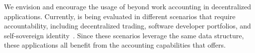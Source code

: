 We envision and encourage the usage of \TrustChain{} beyond work accounting in decentralized applications.
Currently, \TrustChain{} is being evaluated in different scenarios that require accountability, including decentralized trading, software developer portfolios, and self-sovereign identity~\cite{de2021xchange,de2019devid,stokkink2018deployment}.
Since these scenarios leverage the same data structure, these applications all benefit from the accounting capabilities that \TrustChain{} offers.
